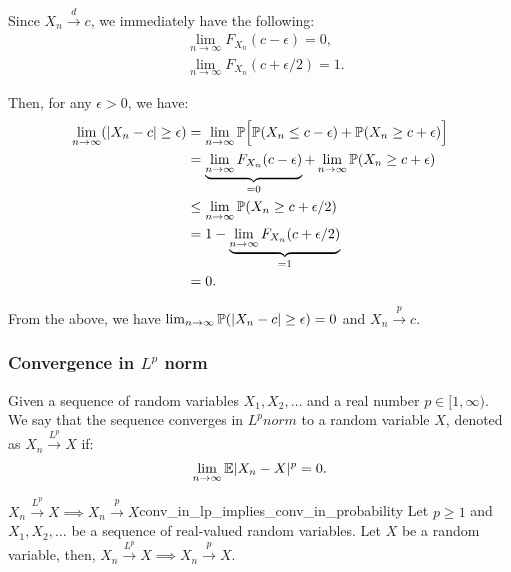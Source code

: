 \begin{proof*}
    Since $X_n\xrightarrow{d}c$, we immediately have the following:
    \begin{align*}
        &\lim_{n\to\infty} F_{X_n}(c - \epsilon) = 0, \\
        &\lim_{n\to\infty} F_{X_n}(c + \epsilon / 2) = 1. 
    \end{align*}

    \noindent Then, for any $\epsilon>0$, we have:
    \begin{align*}
        \lim_{n\to\infty} (|X_n - c|\ge \epsilon) &= \lim_{n\to\infty}\mathbb{P}\Big[ \mathbb{P}(X_n \le c - \epsilon) + \mathbb{P}(X_n \ge c + \epsilon) \Big] \\
            &= \underbrace{\lim_{n\to\infty} F_{X_n}(c-\epsilon)}_{=0} + \lim_{n\to\infty}\mathbb{P}(X_n\ge c+ \epsilon) \\
            &\le \lim_{n\to\infty} \mathbb{P}(X_n \ge c + \epsilon/2) \\
            &= 1 - \underbrace{\lim_{n\to\infty} F_{X_n}(c + \epsilon/2)}_{=1} \\
            &= 0.
    \end{align*}

    \noindent From the above, we have $\lim_{n\to\infty}\mathbb{P}(|X_n-c|\ge\epsilon)=0$ and $X_n\xrightarrow{p}c$.
\end{proof*}

\subsubsection{\texorpdfstring{Convergence in $L^p$ norm}{}}
\begin{definition}
    Given a sequence of random variables $X_1, X_2, \dots$ and a real number $p\in[1, \infty)$. We say that the sequence converges in $L^p norm$ to a random variable $X$, denoted as $X_n\xrightarrow{L^p} X$ if:
    \begin{equation}
        \lim_{n\to\infty} \mathbb{E}|X_n - X|^p = 0.
    \end{equation}
\end{definition}

\begin{proposition}{$X_n\xrightarrow{L^p}X\implies X_n\xrightarrow{p}X$}{conv_in_lp_implies_conv_in_probability}
    Let $p\ge 1$ and $X_1, X_2, \dots$ be a sequence of real-valued random variables. Let $X$ be a random variable, then, $X_n\xrightarrow{L^p}X\implies X_n\xrightarrow{p}X$. 
\end{proposition}

